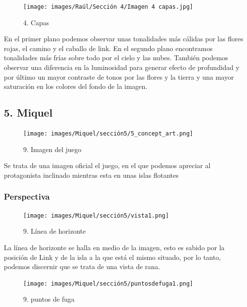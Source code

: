 \documentclass[12pt]{article}
\begin{document}
\begin{figure}[H]
      \centering
      \texttt{[image: images/Raúl/Sección 4/Imagen 4 capas.jpg]}
      \caption{\small 4. Capas}
\end{figure}

 En el primer plano podemos observar unas tonalidades más cálidas por las flores rojas, el camino y el caballo de link. En el segundo plano encontramos tonalidades más frías sobre todo por el cielo y las nubes. También podemos observar una diferencia en la luminosidad para generar efecto de profundidad y por último un mayor contraste de tonos por las flores y la tierra y una mayor saturación en los colores del fondo de la imagen.


        \newpage


    \subsection{5. Miquel}
        \begin{figure}[H]
      \centering
      \texttt{[image: images/Miquel/sección5/5\_concept\_art.png]}
      \caption{\small 9. Imagen del juego}
    \end{figure}

    Se trata de una imagen oficial el juego, en el que podemos apreciar al protagonista inclinado mientras esta en unas islas flotantes

        \subsubsection{Perspectiva}

    \begin{figure}[H]
      \centering
      \texttt{[image: images/Miquel/sección5/vista1.png]}
      \caption{\small 9. Línea de horizonte}
    \end{figure}

    La línea de horizonte se halla en medio de la imagen, esto es sabido por la posición de Link y de la isla a la que está el mismo situado, por lo tanto, podemos discernir que se trata de una vista de rana.


    \begin{figure}[H]
      \centering
      \texttt{[image: images/Miquel/sección5/puntosdefuga1.png]}
      \caption{\small 9. puntos de fuga}
    \end{figure}
\end{document}
